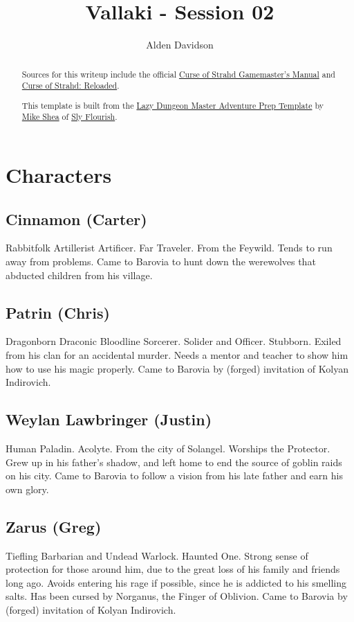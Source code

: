 \documentclass[a4paper,11pt]{article}
\title{Vallaki - Session 02}
\author{Alden Davidson}
\begin{document}
\maketitle
\tableofcontents

\begin{abstract}
  Sources for this writeup include the official
  \href{https://5e.tools/adventure.html#cos}{Curse of Strahd Gamemaster's Manual} and
  \href{https://www.reddit.com/r/CurseofStrahd/comments/9bpzbh/curse_of_strahd_reloaded_compilation_thread/}{Curse of Strahd: Reloaded}.
  
  This template is built from the
  \href{https://slyflourish.com/rotldm_template.html}{Lazy Dungeon Master Adventure Prep Template} by
  \href{https://slyflourish.com/about_mike_shea.html}{Mike Shea} of \href{https://slyflourish.com/}{Sly Flourish}.
\end{abstract}

\pagebreak
\section{Characters}
\label{sec:Characters}
\subsection{Cinnamon (Carter)}
  Rabbitfolk Artillerist Artificer. Far Traveler. From the Feywild. Tends to run away from problems. Came to
  Barovia to hunt down the werewolves that abducted children from his village.
\subsection{Patrin (Chris)}
  Dragonborn Draconic Bloodline Sorcerer. Solider and Officer. Stubborn. Exiled from his clan for an accidental 
  murder. Needs a mentor and teacher to show him how to use his magic properly. Came to Barovia by (forged)
  invitation of Kolyan Indirovich.
\subsection{Weylan Lawbringer (Justin)}
  Human Paladin. Acolyte. From the city of Solangel. Worships the Protector. Grew up in his father's shadow, and 
  left home to end the source of goblin raids on his city. Came to Barovia to follow a vision from his late 
  father and earn his own glory.
\subsection{Zarus (Greg)}
  Tiefling Barbarian and Undead Warlock. Haunted One. Strong sense of protection for those around him, due to the
  great loss of his family and friends long ago. Avoids entering his rage if possible, since he is addicted to 
  his smelling salts. Has been cursed by Norganus, the Finger of Oblivion. Came to Barovia by (forged) 
  invitation of Kolyan Indirovich.
\end{document}
